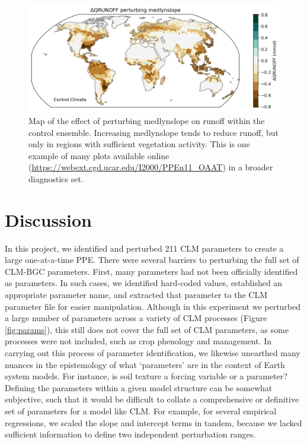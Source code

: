 \documentclass[draft]{agujournal2019}
\begin{document}
\begin{figure}[h]
\centering
\includegraphics[width=\textwidth]{../figs/QRUNOFFabs_x_medlynslope_CTL2010.png}
\caption{Map of the effect of perturbing medlynslope on runoff within the control ensemble. Increasing medlynslope tends to reduce runoff, but only in regions with sufficient vegetation activity. This is one example of many plots available online (\url{https://webext.cgd.ucar.edu/I2000/PPEn11_OAAT}) in a broader diagnostics set. }
\label{fig:map}
\end{figure}

\section{Discussion}

In this project, we identified and perturbed 211 CLM parameters to create a large one-at-a-time PPE. There were several barriers to perturbing the full set of CLM-BGC parameters. First, many parameters had not been officially identified as parameters. In such cases, we identified hard-coded values, established an appropriate parameter name, and extracted that parameter to the CLM parameter file for easier manipulation. Although in this experiment we perturbed a large number of parameters across a variety of CLM processes (Figure \ref{fig:params}), this still does not cover the full set of CLM parameters, as some processes were not included, such as crop phenology and management. In carrying out this process of parameter identification, we likewise unearthed many nuances in the epistemology of what `parameters' are in the context of Earth system models. For instance, is soil texture a forcing variable or a parameter? Defining the parameters within a given model structure can be somewhat subjective, such that it would be difficult to collate a comprehensive or definitive set of parameters for a model like CLM. For example, for several empirical regressions, we scaled the slope and intercept terms in tandem, because we lacked sufficient information to define two independent perturbation ranges.
\end{document}
